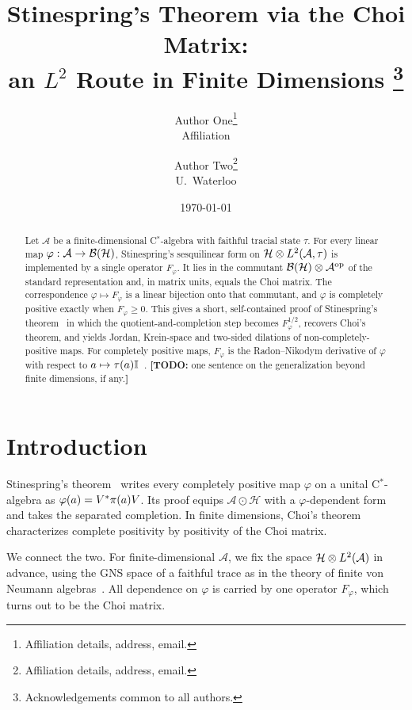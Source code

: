 \documentclass[12pt]{article}
\title{\textbf{Stinespring's Theorem via the Choi Matrix:\\
an \texorpdfstring{\(L^2\)}{L2} Route in Finite Dimensions}%
\thanks{Acknowledgements common to all authors.}}
\author{
  Author One\thanks{Affiliation details, address, email.} \\
  Affiliation
  \and
  Author Two\thanks{Affiliation details, address, email.} \\
  U.\ Waterloo
}
\date{\today}
\newcommand{\todo}[1]{\textcolor{\mysubcolor}{\small\textbf{[TODO:} #1\textbf{]}}}
\newcommand{\alg}{\mathcal{A}}             %
\newcommand{\hilb}{\mathcal{H}}            %
\newcommand{\bdd}[1]{\mathcal{B}\br{#1}}   %
\newcommand{\algtensor}{\odot}             %
\newcommand{\op}{^{\mathrm{op}}}           %
\newcommand{\Ltwo}{L^2\br{\alg}}
\newcommand{\Ltn}{\hilb \tensor \Ltwo}
\newcommand{\Fphi}{F_{\varphi}}
\begin{document}
\maketitle

\begin{abstract}
Let \(\alg\) be a finite-dimensional C\(^*\)-algebra with faithful tracial state
\(\tau\). For every linear map \(\varphi : \alg \to \bdd{\hilb}\), Stinespring's
sesquilinear form on \(\hilb \tensor L^2(\alg,\tau)\) is implemented by a single
operator \(\Fphi\). It lies in the commutant
\(\bdd{\hilb} \tensor \alg\op\) of the standard representation and, in matrix
units, equals the Choi matrix. The correspondence \(\varphi \mapsto \Fphi\) is a
linear bijection onto that commutant, and \(\varphi\) is completely positive
exactly when \(\Fphi \ge 0\). This gives a short, self-contained proof of
Stinespring's theorem~\cite{Stinespring1955} in which the quotient-and-completion
step becomes \(\Fphi^{1/2}\), recovers Choi's theorem, and yields Jordan,
Krein-space and two-sided dilations of non-completely-positive maps. For
completely positive maps, \(\Fphi\) is the Radon--Nikodym derivative of
\(\varphi\) with respect to \(a \mapsto \tau(a){\mathbb I}\)~\cite{Arveson1969,
BelavkinStaszewski1986,Raginsky2003}. \todo{one sentence on the generalization
beyond finite dimensions, if any.}
\end{abstract}

\tableofcontents

\section{Introduction}
\label{sec:intro}

Stinespring's theorem~\cite{Stinespring1955} writes every completely positive map
\(\varphi\) on a unital C\(^*\)-algebra as \(\varphi(a) = V^*\pi(a)V\). Its
proof equips \(\alg \algtensor \hilb\) with a \(\varphi\)-dependent form and takes
the separated completion. In finite dimensions, Choi's theorem~\cite{Choi1975}
characterizes complete positivity by positivity of the Choi matrix.

We connect the two. For finite-dimensional \(\alg\), we fix the space
\(\Ltn\) in advance, using the GNS space of a faithful trace as in the theory of
finite von Neumann algebras~\cite{AnantharamanPopa}. All dependence on \(\varphi\)
is carried by one operator \(\Fphi\), which turns out to be the Choi matrix.
\end{document}
